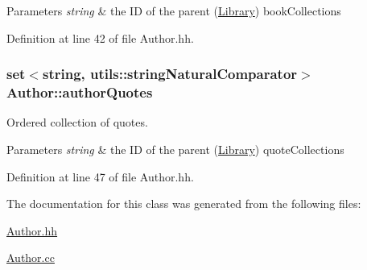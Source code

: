 \begin{DoxyParams}{Parameters}
{\em string} & the ID of the parent (\hyperlink{class_library}{Library}) book\+Collection\textquotesingle{}s \\
\hline
\end{DoxyParams}


Definition at line 42 of file Author.\+hh.

\subsubsection[{\texorpdfstring{author\+Quotes}{authorQuotes}}]{\setlength{\rightskip}{0pt plus 5cm}set$<$string, {\bf utils\+::string\+Natural\+Comparator}$>$ Author\+::author\+Quotes\hspace{0.3cm}{\ttfamily [private]}}\hypertarget{class_author_a117bc50449e2f8d61f30632dde7d73ff}{}\label{class_author_a117bc50449e2f8d61f30632dde7d73ff}


Ordered collection of quotes. 


\begin{DoxyParams}{Parameters}
{\em string} & the ID of the parent (\hyperlink{class_library}{Library}) quote\+Collection\textquotesingle{}s \\
\hline
\end{DoxyParams}


Definition at line 47 of file Author.\+hh.



The documentation for this class was generated from the following files\+:\begin{DoxyCompactItemize}
\item 
\hyperlink{_author_8hh}{Author.\+hh}\item 
\hyperlink{_author_8cc}{Author.\+cc}\end{DoxyCompactItemize}
